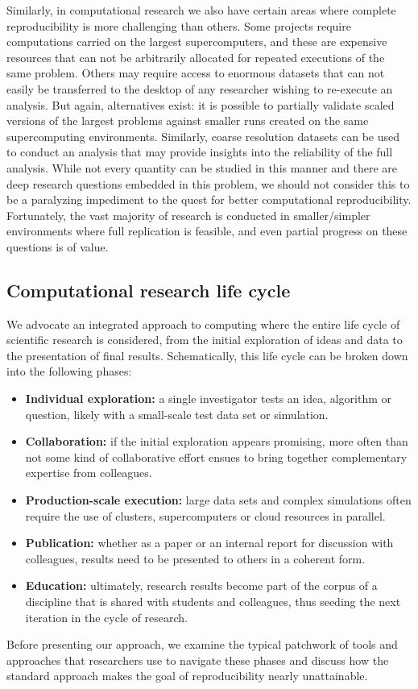 \documentclass[ChapterTOCs,krantz2]{krantz} %
\begin{document}
Similarly, in computational research we also have certain areas where complete
reproducibility is more challenging than others. Some projects require
computations carried on the largest supercomputers, and these are expensive
resources that can not be arbitrarily allocated for repeated executions of the
same problem. Others may require access to enormous datasets that can not
easily be transferred to the desktop of any researcher wishing to re-execute an
analysis.  But again, alternatives exist: it is possible to partially validate
scaled versions of the largest problems against smaller runs created on the
same supercomputing environments.  Similarly, coarse resolution datasets can be
used to conduct an analysis that may provide insights into the reliability of
the full analysis.  While not every quantity can be studied in this manner and
there are deep research questions embedded in this problem, we should not
consider this to be a paralyzing impediment to the quest for better
computational reproducibility.  Fortunately, the vast majority of research is
conducted in smaller/simpler environments where full replication is feasible,
and even partial progress on these questions is of value.

\subsection{Computational research life cycle}

We advocate an integrated approach to computing where the entire
life cycle of scientific research is considered, from the initial exploration
of ideas and data to the presentation of final results.  Schematically, this
life cycle can be broken down into the following phases:

\begin{itemize}
\item \textbf{Individual exploration:} a single investigator tests an idea,
  algorithm or question, likely with a small-scale test data set or simulation.
\item \textbf{Collaboration:} if the initial exploration appears promising,
  more often than not some kind of collaborative effort ensues to bring
  together complementary expertise from colleagues.
\item \textbf{Production-scale execution:} large data sets and complex
  simulations often require the use of clusters, supercomputers or cloud
  resources in parallel.
\item \textbf{Publication:} whether as a paper or an internal report for
  discussion with colleagues, results need to be presented to others in a
  coherent form.
\item \textbf{Education:} ultimately, research results become part of the
  corpus of a discipline that is shared with students and colleagues, thus
  seeding the next iteration in the cycle of research.
\end{itemize}
Before presenting our approach, we examine the typical patchwork of tools and
approaches that researchers use to navigate these phases and discuss how the
standard approach makes the goal of reproducibility nearly unattainable.
\end{document}
